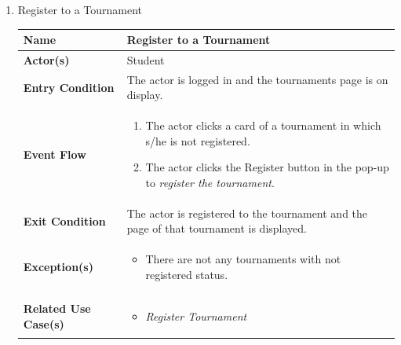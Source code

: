 \begin{enumerate}
\item Register to a Tournament
\begin{center}
    \begin{tabular}{ | m{10em} | m{10cm}| } 
      \hline
      \textbf{Name} & Register to a Tournament  \\ 
      \hline
      \textbf{Actor(s)} & Student \\ 
      \hline
      \textbf{Entry Condition} & The actor is logged in and the tournaments page is on display.\\ 
      \hline
      \textbf{Event Flow} & 
          \begin{enumerate}[(1)]
              \item The actor clicks a card of a tournament in which s/he is not registered.
              \item The actor clicks the Register button in the pop-up to \textit{register the tournament}.
          \end{enumerate}
      \\ 
      \hline
      \textbf{Exit Condition} & The actor is registered to the tournament and the page of that tournament is displayed.  \\ 
      \hline
      \textbf{Exception(s)} & 
      \begin{itemize}
          \item There are not any tournaments with not registered status.
      \end{itemize}
          \\ 
      \hline
      \textbf{Related Use Case(s)} & 
      \begin{itemize}
          \item \textit{Register Tournament}
      \end{itemize}
          \\ 
      \hline
    \end{tabular}
    \label{tbl:uc10}
\end{center}


\newpage



\end{enumerate}
